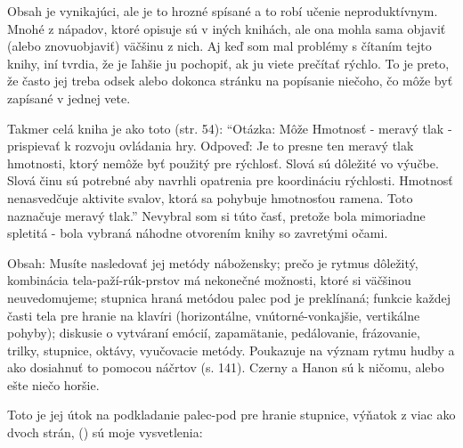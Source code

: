 \documentclass[11pt,a4paper]{book}
\begin{document}
Obsah je vynikajúci, ale je to hrozné spísané a to robí učenie neproduktívnym. Mnohé z nápadov, ktoré opisuje sú v iných knihách, ale ona mohla sama objaviť (alebo znovuobjaviť) väčšinu z nich. Aj keď som mal problémy s čítaním tejto knihy, iní tvrdia, že je ľahšie ju pochopiť, ak ju viete prečítať rýchlo. To je preto, že často jej treba odsek alebo dokonca stránku na popísanie niečoho, čo môže byť zapísané v jednej vete. 

Takmer celá kniha je ako toto (str. 54): “Otázka: Môže Hmotnosť - meravý tlak - prispievať k rozvoju ovládania hry. Odpoveď: Je to presne ten meravý tlak hmotnosti, ktorý nemôže byť použitý pre rýchlosť. Slová sú dôležité vo výučbe. Slová činu sú potrebné aby navrhli opatrenia pre koordináciu rýchlosti. Hmotnosť nenasvedčuje aktivite svalov, ktorá sa pohybuje hmotnosťou ramena. Toto naznačuje meravý tlak.” Nevybral som si túto časť, pretože bola mimoriadne spletitá - bola vybraná náhodne otvorením knihy so zavretými očami. 

Obsah: Musíte nasledovať jej metódy nábožensky; prečo je rytmus dôležitý, kombinácia tela-paží-rúk-prstov má nekonečné možnosti, ktoré si väčšinou neuvedomujeme; stupnica hraná metódou palec pod je preklínaná; funkcie každej časti tela pre hranie na klavíri (horizontálne, vnútorné-vonkajšie, vertikálne pohyby); diskusie o vytváraní emócií, zapamätanie, pedálovanie, frázovanie, trilky, stupnice, oktávy, vyučovacie metódy. Poukazuje na význam rytmu hudby a ako dosiahnuť to pomocou náčrtov (s. 141). Czerny a Hanon sú k ničomu, alebo ešte niečo horšie. 

Toto je jej útok na podkladanie palec-pod pre hranie stupnice, výňatok z viac ako dvoch strán, () sú moje vysvetlenia: 
\end{document}
